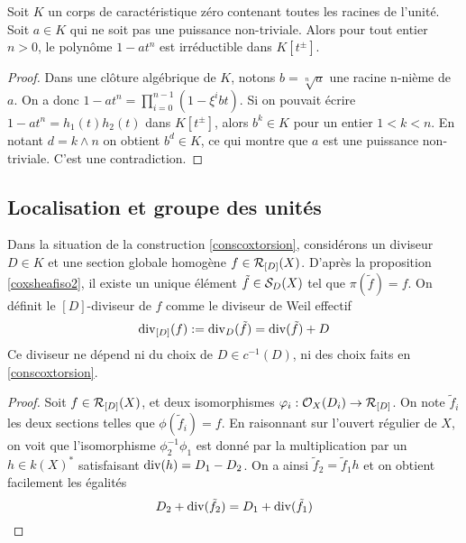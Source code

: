 \begin{lem}[Car. 0]
Soit $K$ un corps de caractéristique zéro contenant toutes les racines de l'unité. Soit $a\in K$ qui ne soit pas une puissance non-triviale. Alors pour tout entier $n> 0$, le polynôme $1-at^n$ est irréductible dans $K[t^\pm]$.
\end{lem}
\begin{proof}
Dans une clôture algébrique de $K$, notons $b=\sqrt[n]{a}$ une racine n-nième de $a$. On a donc $1-at^n=\prod_{i=0}^{n-1}(1-\xi^i bt)$. Si on pouvait écrire $1-at^n=h_1(t)h_2(t)$ dans $K[t^\pm]$, alors $b^k\in K$ pour un entier $1<k<n$. En notant $d=k\wedge n$ on obtient $b^d\in K$, ce qui montre que $a$ est une puissance non-triviale. C'est une contradiction.
\end{proof}

\subsection{Localisation et groupe des unités}

\begin{cons}\label{conscoxtorsionDDiviseur}
Dans la situation de la construction \ref{conscoxtorsion}, considérons un diviseur $D\in K$ et une section globale homogène $f\in\mathcal{R}_{[D]}(X)$. D'après la proposition \ref{coxsheafiso2}, il existe un unique élément $\tilde{f}\in\mathcal{S}_D(X)$ tel que $\pi(\tilde{f})=f$. On définit le $[D]$-diviseur de $f$ comme le diviseur de Weil effectif
$$\operatorname{div}_{[D]}(f):=\operatorname{div}_D(\tilde{f})=\operatorname{div}(\tilde{f})+D$$
Ce diviseur ne dépend ni du choix de $D\in c^{-1}(D)$, ni des choix faits en \ref{conscoxtorsion}.
\end{cons}
\begin{proof}
Soit $f\in\mathcal{R}_{[D]}(X)$, et deux isomorphismes $\varphi_i:\mathcal{O}_X(D_i)\rightarrow \mathcal{R}_{[D]}$. On note $\tilde{f}_i$ les deux sections telles que $\phi(\tilde{f}_i)=f$. En raisonnant sur l'ouvert régulier de $X$, on voit que l'isomorphisme $\phi_2^{-1}\phi_1$ est donné par la multiplication par un $h\in k(X)^*$ satisfaisant $\operatorname{div}(h)=D_1-D_2$. On a ainsi $\tilde{f}_2=\tilde{f}_1h$ et on obtient facilement les égalités
$$D_2+\operatorname{div}(\tilde{f}_2)=D_1+\operatorname{div}(\tilde{f}_1)$$
\end{proof}


